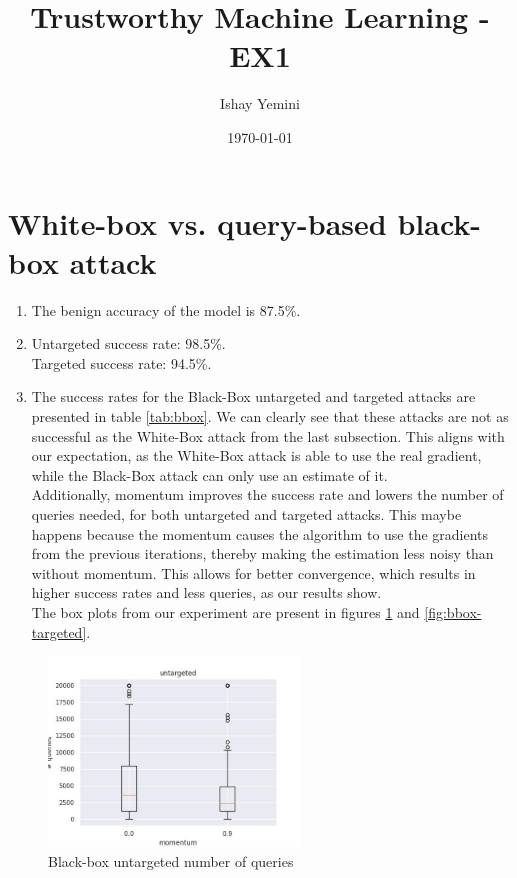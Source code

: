 \documentclass[12pt, a4paper]{article}
\title{Trustworthy Machine Learning - EX1}
\author{Ishay Yemini}
\date{\today}
\begin{document}
\maketitle

\section{White-box vs. query-based black-box attack}

\begin{enumerate}
  \item The benign accuracy of the model is 87.5\%.
  \item Untargeted success rate: 98.5\%. \\ 
  Targeted success rate: 94.5\%.
  \item The success rates for the Black-Box untargeted and targeted attacks are presented in table \ref{tab:bbox}. We can clearly see that these attacks are not as successful as the White-Box attack from the last subsection. This aligns with our expectation, as the White-Box attack is able to use the real gradient, while the Black-Box attack can only use an estimate of it. \\
  Additionally, momentum improves the success rate and lowers the number of queries needed, for both untargeted and targeted attacks. This maybe happens because the momentum causes the algorithm to use the gradients from the previous iterations, thereby making the estimation less noisy than without momentum. This allows for better convergence, which results in higher success rates and less queries, as our results show. \\
  The box plots from our experiment are present in figures \ref{fig:bbox-untargeted} and \ref{fig:bbox-targeted}.
\end{enumerate}


\begin{figure}[hbt]
  \centering
  \includegraphics[width=0.6\textwidth]{bbox-n_queries_untargeted}  
  \caption{Black-box untargeted number of queries}
  \label{fig:bbox-untargeted}
\end{figure}
\end{document}
